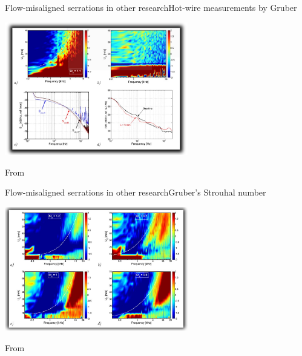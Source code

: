 \documentclass[xcolor=table,aspectratio=169]{beamer}
\begin{document}
\begin{frame}[b]{Flow-misaligned serrations in other research}{Hot-wire measurements by Gruber}
    \vspace{1cm}
    \begin{center}
        \includegraphics[width=0.60\textwidth]{media/GruberHotwireComparison.png}
        \begin{flushright}
            \vspace{-1mm}
            \scriptsize{
                From \cite{Gruber2011}\hspace{3cm}
            }
        \end{flushright}
    \end{center}
\end{frame}

\begin{frame}[b]{Flow-misaligned serrations in other research}{Gruber's Strouhal number}
    \vspace{1cm}
    \begin{center}
        \includegraphics[width=0.60\textwidth]{media/GruberStrouhal.jpg}
        \begin{flushright}
            \vspace{-1mm}
            \scriptsize{
                From \cite{Gruber2011}\hspace{3cm}
            }
        \end{flushright}
    \end{center}
\end{frame}
\end{document}
